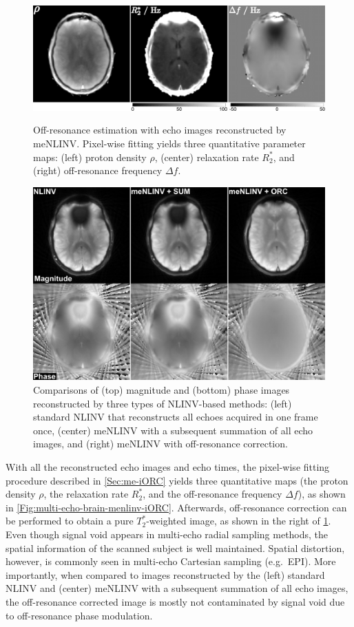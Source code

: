 \begin{figure}[p]
  \centering
  \includegraphics[width=\textwidth]{fig/multi-echo-brain-menlinv-iORC.png}
  \caption{Off-resonance estimation with echo images reconstructed by meNLINV. Pixel-wise fitting yields three quantitative parameter maps: (left) proton density $\rho$, (center) relaxation rate $R_2^*$, and (right) off-resonance frequency $\Delta f$.} \label{Fig:multi-echo-brain-menlinv-iORC}
  
  \par\bigskip
  
  \includegraphics[width=\textwidth]{fig/multi-echo-brain-reco-comp.png}
  \caption{Comparisons of (top) magnitude and (bottom) phase images reconstructed by three types of NLINV-based methods: (left) standard NLINV that reconstructs all echoes acquired in one frame once, (center) meNLINV with a subsequent summation of all echo images, and (right) meNLINV with off-resonance correction.} \label{Fig:multi-echo-brain-reco-comp}
\end{figure}
With all the reconstructed echo images and echo times, the pixel-wise fitting procedure described in \cref{Sec:me-iORC} yields three quantitative maps (the proton density $\rho$, the relaxation rate $R_2^*$, and the off-resonance frequency $\Delta f$), as shown in \cref{Fig:multi-echo-brain-menlinv-iORC}. Afterwards, off-resonance correction can be performed to obtain a pure $T_2^*$-weighted image, as shown in the right of \cref{Fig:multi-echo-brain-reco-comp}. Even though signal void appears in multi-echo radial sampling methods, the spatial information of the scanned subject is well maintained. Spatial distortion, however, is commonly seen in multi-echo Cartesian sampling (e.g.~EPI). More importantly, when compared to images reconstructed by the (left) standard NLINV and (center) meNLINV with a subsequent summation of all echo images, the off-resonance corrected image is mostly not contaminated by signal void due to off-resonance phase modulation.

